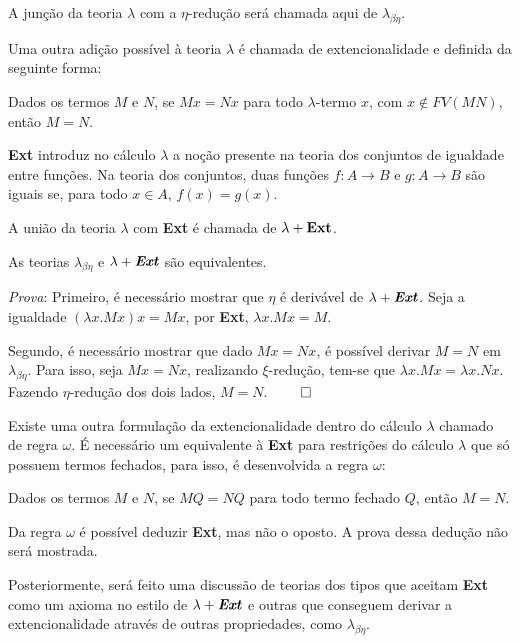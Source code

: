 \documentclass[../main.tex]{subfiles}
\begin{document}
A junção da teoria $\lambda$ com a $\eta$-redução será chamada aqui de $\lambda_{\beta \eta}$.

Uma outra adição possível à teoria $\lambda$ é chamada de extencionalidade e definida da seguinte forma:

\begin{definition}
    Dados os termos $M$ e $N$, se $M x = N x$ para todo $\lambda$-termo $x$, com $x \not\in FV(MN)$, então $M = N$.
\end{definition}

\textbf{Ext} introduz no cálculo $\lambda$ a noção presente na teoria dos conjuntos de igualdade entre funções. Na teoria dos conjuntos, duas funções $f : A \to B$ e $g : A \to B$ são iguais se, para todo $x \in A$, $f(x) = g(x)$. 

A união da teoria $\lambda$ com \textbf{Ext} é chamada de $\lambda + \text{\textbf{Ext}}$. 


\begin{theorem}
    As teorias $\lambda_{\beta \eta}$ e $\lambda + \text{\textbf{\emph{Ext}}}$ são equivalentes.
\end{theorem}

\emph{Prova}: Primeiro, é necessário mostrar que $\eta$ é derivável de $\lambda + \text{\textbf{\emph{Ext}}}$. Seja a igualdade $(\lambda x . Mx)x = Mx$, por \textbf{Ext}, $\lambda x . Mx = M$. 

Segundo, é necessário mostrar que dado $Mx = Nx$, é possível derivar $M = N$ em $\lambda_{\beta \eta}$. Para isso, seja $Mx = Nx$, realizando $\xi$-redução, tem-se que $\lambda x . Mx = \lambda x . Nx$. Fazendo $\eta$-redução dos dois lados, $M = N$. $\qed$

Existe uma outra formulação da extencionalidade dentro do cálculo $\lambda$ chamado de regra $\omega$. É necessário um equivalente à \textbf{Ext} para restrições do cálculo $\lambda$ que só possuem termos fechados, para isso, é desenvolvida a regra $\omega$:

\begin{definition}
    Dados os termos $M$ e $N$, se $MQ = NQ$ para todo termo fechado $Q$, então $M = N$.
\end{definition}

Da regra $\omega$ é possível deduzir \textbf{Ext}, mas não o oposto. A prova dessa dedução não será mostrada.

Posteriormente, será feito uma discussão de teorias dos tipos que aceitam \textbf{Ext} como um axioma no estilo de $\lambda + \text{\textbf{\emph{Ext}}}$ e outras que conseguem derivar a extencionalidade através de outras propriedades, como $\lambda_{\beta \eta}$. 
\end{document}
